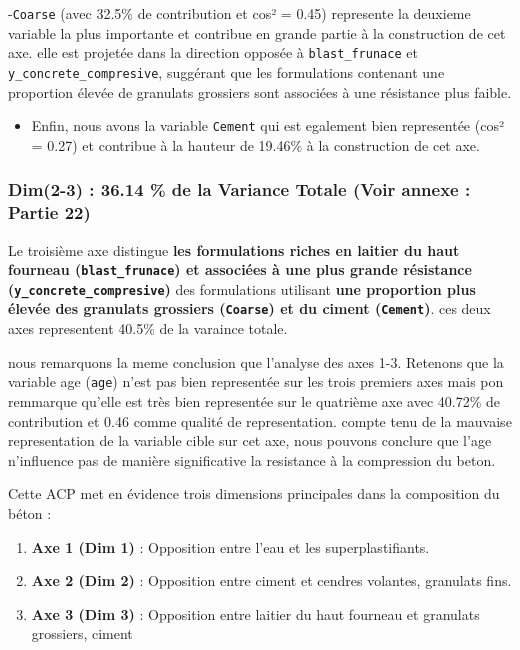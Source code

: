 \documentclass[
  12pt,
]{article}
\providecommand{\tightlist}{%
  \setlength{\itemsep}{0pt}\setlength{\parskip}{0pt}}
\begin{document}
-\texttt{Coarse} (avec 32.5\% de contribution et cos² = 0.45) represente
la deuxieme variable la plus importante et contribue en grande partie à
la construction de cet axe. elle est projetée dans la direction opposée
à \texttt{blast\_frunace} et \texttt{y\_concrete\_compresive}, suggérant
que les formulations contenant une proportion élevée de granulats
grossiers sont associées à une résistance plus faible.

\begin{itemize}
\tightlist
\item
  Enfin, nous avons la variable \texttt{Cement} qui est egalement bien
  representée (cos² = 0.27) et contribue à la hauteur de 19.46\% à la
  construction de cet axe.
\end{itemize}

\subsubsection{Dim(2-3) : 36.14 \% de la Variance Totale (Voir annexe :
Partie
22)}\label{dim2-3-36.14-de-la-variance-totale-voir-annexe-partie-22}

Le troisième axe distingue \textbf{les formulations riches en laitier du
haut fourneau (\texttt{blast\_frunace}) et associées à une plus grande
résistance (\texttt{y\_concrete\_compresive})} des formulations
utilisant \textbf{une proportion plus élevée des granulats grossiers
(\texttt{Coarse}) et du ciment (\texttt{Cement})}. ces deux axes
representent 40.5\% de la varaince totale.

nous remarquons la meme conclusion que l'analyse des axes 1-3. Retenons
que la variable age (\texttt{age}) n'est pas bien representée sur les
trois premiers axes mais pon remmarque qu'elle est très bien representée
sur le quatrième axe avec 40.72\% de contribution et 0.46 comme qualité
de representation. compte tenu de la mauvaise representation de la
variable cible sur cet axe, nous pouvons conclure que l'age n'influence
pas de manière significative la resistance à la compression du beton.

Cette ACP met en évidence trois dimensions principales dans la
composition du béton :

\begin{enumerate}
\def\labelenumi{\arabic{enumi}.}
\tightlist
\item
  \textbf{Axe 1 (Dim 1)} : Opposition entre l'eau et les
  superplastifiants.
\item
  \textbf{Axe 2 (Dim 2)} : Opposition entre ciment et cendres volantes,
  granulats fins.
\item
  \textbf{Axe 3 (Dim 3)} : Opposition entre laitier du haut fourneau et
  granulats grossiers, ciment
\end{enumerate}
\end{document}
